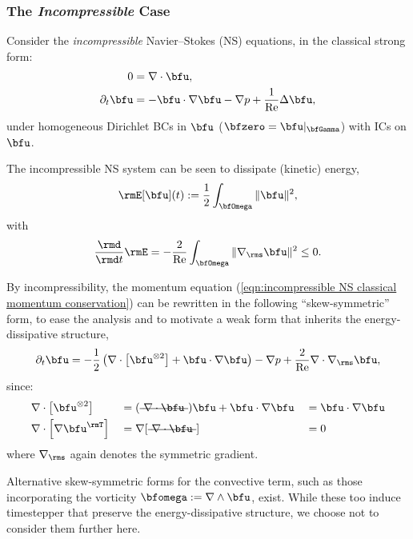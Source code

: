 \subsubsection*{The \emph{Incompressible} Case}
    Consider the \emph{incompressible} Navier--Stokes (NS) equations, in the classical strong form:
    \begin{align}
                       0  &=  \nabla\cdot\bfu,  \label{eqn:incompressible NS mass conservation}  \\
        \partial_{t}\bfu  &=  - \bfu\cdot\nabla\bfu - \nabla p + \frac{1}{\rmRe}\Delta\bfu,  \label{eqn:incompressible NS classical momentum conservation}
    \end{align}
    under homogeneous Dirichlet BCs in $\bfu$ ($\bfzero  =  \bfu|_{\bfGamma}$) with ICs on $\bfu$.
    
    The incompressible NS system can be seen to dissipate (kinetic) energy,
    \begin{equation}\label{eqn:incompressible NS energy definition}
        \rmE[\bfu](t)  :=  \frac{1}{2}\int_{\bfOmega}\|\bfu\|^{2},
    \end{equation}
    with
    \begin{equation}
        \frac{\rmd}{\rmd t}\rmE  =  - \frac{2}{\rmRe}\int_{\bfOmega}\|\nabla_{\rms}\bfu\|^{2}  \leq  0.
    \end{equation}

    By incompressibility, the momentum equation (\ref{eqn:incompressible NS classical momentum conservation}) can be rewritten in the following ``skew-symmetric'' form, to ease the analysis and to motivate a weak form that inherits the energy-dissipative structure,
    \begin{equation}\label{eqn:incompressible NS skew-symmetric momentum equation}
        \partial_{t}\bfu  =  - \frac{1}{2}\left(\nabla\cdot\left[\bfu^{\otimes 2}\right] + \bfu\cdot\nabla\bfu\right) - \nabla p + \frac{2}{\rmRe}\nabla\cdot\nabla_{\rms}\bfu,
    \end{equation}
    since:
    \begin{align}
        &\nabla\cdot\left[\bfu^{\otimes 2}\right]   &&=  (\mst{\nabla\cdot\bfu})\bfu + \bfu\cdot\nabla\bfu  &&=  \bfu\cdot\nabla\bfu  \\
        &\nabla\cdot\left[\nabla\bfu^{\rmT}\right]  &&=  \nabla[\mst{\nabla\cdot\bfu}]                      &&=  0
    \end{align}
    where $\nabla_{\rms}$ again denotes the symmetric gradient.

    \begin{remark}
        Alternative skew-symmetric forms for the convective term, such as those incorporating the vorticity $\bfomega  :=  \nabla\wedge\bfu$, exist. While these too induce timestepper that preserve the energy-dissipative structure, we choose not to consider them further here.
    \end{remark}

